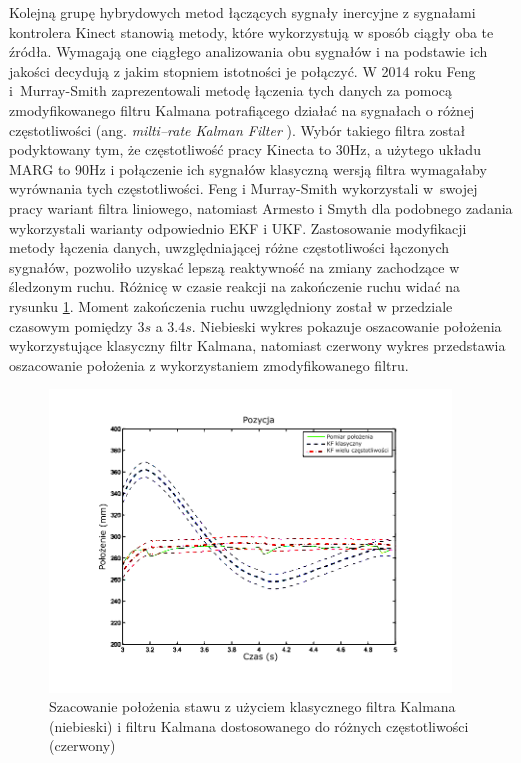 	Kolejną grupę hybrydowych metod łączących sygnały inercyjne z sygnałami kontrolera Kinect stanowią metody, które wykorzystują w sposób ciągły oba te źródła. Wymagają one ciągłego analizowania obu sygnałów i na podstawie ich jakości decydują z jakim stopniem istotności je połączyć. W 2014 roku Feng i~Murray-Smith \cite{Murray-Smith2014} zaprezentowali metodę łączenia tych danych za pomocą zmodyfikowanego filtru Kalmana potrafiącego działać na sygnałach o różnej częstotliwości (ang. \emph{milti--rate Kalman Filter} \cite{Dhuli2009}). Wybór takiego filtra został podyktowany tym, że częstotliwość pracy Kinecta to 30Hz, a użytego układu MARG to 90Hz i połączenie ich sygnałów klasyczną wersją filtra wymagałaby wyrównania tych częstotliwości. Feng i Murray-Smith wykorzystali w~swojej pracy wariant filtra liniowego, natomiast Armesto i Smyth dla podobnego zadania wykorzystali warianty odpowiednio EKF\cite{Armesto01062007} i UKF\cite{Smyth2007}. Zastosowanie modyfikacji metody łączenia danych, uwzględniającej różne częstotliwości łączonych sygnałów, pozwoliło uzyskać lepszą reaktywność na zmiany zachodzące w śledzonym ruchu. Różnicę w czasie reakcji na zakończenie ruchu widać na rysunku \ref{fig:literature:feng}. Moment zakończenia ruchu uwzględniony został w przedziale czasowym pomiędzy $3s$ a $3.4s$. Niebieski wykres pokazuje oszacowanie położenia wykorzystujące klasyczny filtr Kalmana, natomiast czerwony wykres przedstawia oszacowanie położenia z wykorzystaniem zmodyfikowanego filtru.
		
	\begin{figure}[!htp]
		\centering 
		\includegraphics[width=0.95\textwidth]{images/Fig03.png}	
		\caption{Szacowanie położenia stawu z użyciem klasycznego filtra Kalmana (niebieski) i filtru Kalmana dostosowanego do różnych częstotliwości (czerwony) \cite{Murray-Smith2014}}
		\label{fig:literature:feng}
	\end{figure}
		
